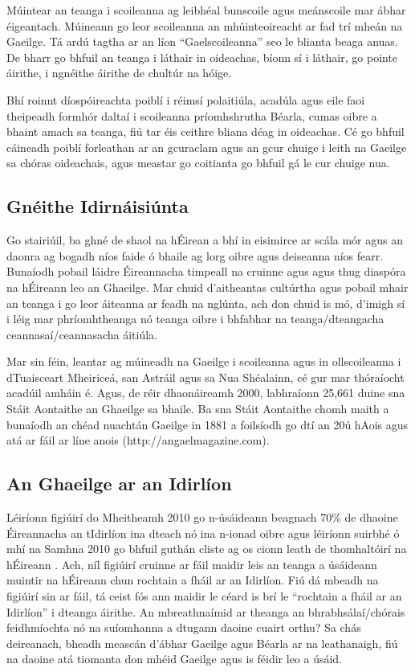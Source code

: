 \documentclass[]{../../metanetpaper}
\begin{document}
\begin{multicols}{2}
Múintear an teanga i scoileanna ag leibhéal bunscoile agus meánscoile mar ábhar éigeantach. Múineann go leor scoileanna an mhúinteoireacht ar fad trí mheán na Gaeilge. Tá ardú tagtha ar an líon “Gaelscoileanna” seo le blianta beaga anuas. De bharr go bhfuil an teanga i láthair in oideachas, bíonn sí i láthair, go pointe áirithe, i ngnéithe áirithe de chultúr na hóige. 

Bhí roinnt díospóireachta poiblí i réimsí polaitiúla, acadúla agus eile faoi theipeadh formhór daltaí i scoileanna príomhshrutha Béarla, cumas oibre a bhaint amach sa teanga, fiú tar éis ceithre bliana déag in oideachas. Cé go bhfuil cáineadh poiblí forleathan ar an gcuraclam agus an gcur chuige i leith na Gaeilge sa chóras oideachais, agus meastar go coitianta go bhfuil gá le cur chuige nua.


\subsection{Gnéithe Idirnáisiúnta}

Go stairiúil, ba ghné de shaol na hÉirean a bhí in eisimirce ar scála mór agus an daonra ag bogadh níos faide ó bhaile ag lorg oibre agus deiseanna níos fearr. Bunaíodh pobail láidre Éireannacha timpeall na cruinne agus agus thug diaspóra na hÉireann leo an Ghaeilge. Mar chuid d’aitheantas cultúrtha agus pobail mhair an teanga i go leor áiteanna ar feadh na nglúnta, ach don chuid is mó, d’imigh sí i léig mar phríomhtheanga nó teanga oibre i bhfabhar na teanga/dteangacha ceannasaí/ceannasacha áitiúla. 

Mar sin féin, leantar ag múineadh na Gaeilge i scoileanna agus in ollscoileanna i dTuaisceart Mheiriceá, san Astráil agus sa Nua Shéalainn, cé gur mar thóraíocht acadúil amháin é. Agus, de réir dhaonáireamh 2000, labhraíonn 25,661 duine sna Stáit Aontaithe an Ghaeilge sa bhaile. Ba sna Stáit Aontaithe chomh maith a bunaíodh an chéad nuachtán Gaeilge in 1881 a foilsíodh go dtí an 20ú hAois agus atá ar fáil ar líne anois (http://angaelmagazine.com). 


\subsection{An Ghaeilge ar an Idirlíon}

Léiríonn figiúirí do Mheitheamh 2010 go n-úsáideann beagnach 70\% de dhaoine Éireannacha an tIdirlíon ina dteach nó ina n-ionad oibre \cite{internetstats} agus léiríonn suirbhé ó mhí na Samhna 2010 go bhfuil guthán cliste ag os cionn leath de thomhaltóirí na hÉireann \cite{mindshare}.  Ach, níl figiúirí cruinne ar fáil maidir leis an teanga a úsáideann muintir na hÉireann chun rochtain a fháil ar an Idirlíon. Fiú dá mbeadh na figiúirí sin ar fáil, tá ceist fós ann maidir le céard is brí le ``rochtain a fháil ar an Idirlíon'' i dteanga áirithe. An mbreathnaímid ar theanga an bhrabhsálaí/chórais feidhmíochta nó na suíomhanna a dtugann daoine cuairt orthu? Sa chás deireanach, bheadh meascán d’ábhar Gaeilge agus Béarla ar na leathanaigh, fiú na daoine atá tiomanta don mhéid Gaeilge agus is féidir leo a úsáid.


\end{multicols}
\end{document}
